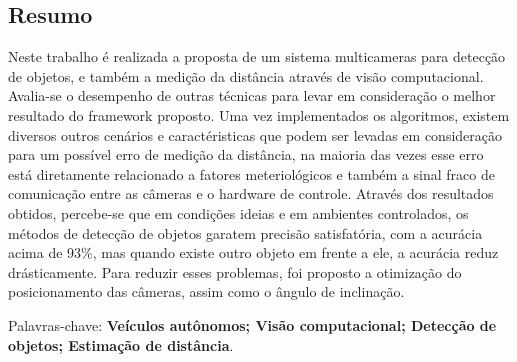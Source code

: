 \begin{flushright}
\chapter*{Resumo}
\end{flushright}

\noindent
Neste trabalho é realizada a proposta de um sistema multicameras para detecção de objetos, e também a medição da distância através de visão computacional. Avalia-se o desempenho de outras técnicas para levar em consideração o melhor resultado do framework proposto. Uma vez implementados os algoritmos, existem diversos outros cenários e caractéristicas que podem ser levadas em consideração para um possível erro de medição da distância, na maioria das vezes esse erro está diretamente relacionado a fatores meteriológicos e também a sinal fraco de comunicação entre as câmeras e o hardware de controle. Através dos resultados obtidos, percebe-se que em condições ideias e em ambientes controlados, os métodos de detecção de objetos garatem precisão satisfatória, com a acurácia acima de 93\%, mas quando existe outro objeto em frente a ele, a acurácia reduz drásticamente. Para reduzir esses problemas, foi proposto a otimização do posicionamento das câmeras, assim como o ângulo de inclinação. 


\noindent
Palavras-chave: \textbf{Veículos autônomos; Visão computacional; Detecção de objetos; Estimação de distância}.



